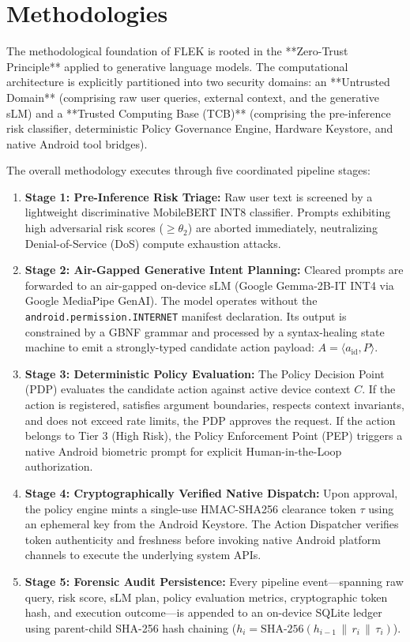 \section{Methodologies}

The methodological foundation of FLEK is rooted in the **Zero-Trust Principle** applied to generative language models. The computational architecture is explicitly partitioned into two security domains: an **Untrusted Domain** (comprising raw user queries, external context, and the generative sLM) and a **Trusted Computing Base (TCB)** (comprising the pre-inference risk classifier, deterministic Policy Governance Engine, Hardware Keystore, and native Android tool bridges).

The overall methodology executes through five coordinated pipeline stages:
\begin{enumerate}
    \item \textbf{Stage 1: Pre-Inference Risk Triage:} Raw user text is screened by a lightweight discriminative MobileBERT INT8 classifier. Prompts exhibiting high adversarial risk scores ($\ge \theta_2$) are aborted immediately, neutralizing Denial-of-Service (DoS) compute exhaustion attacks.
    \item \textbf{Stage 2: Air-Gapped Generative Intent Planning:} Cleared prompts are forwarded to an air-gapped on-device sLM (Google Gemma-2B-IT INT4 via Google MediaPipe GenAI). The model operates without the \texttt{android.permission.INTERNET} manifest declaration. Its output is constrained by a GBNF grammar and processed by a syntax-healing state machine to emit a strongly-typed candidate action payload: $A = \langle a_{\text{id}}, P \rangle$.
    \item \textbf{Stage 3: Deterministic Policy Evaluation:} The Policy Decision Point (PDP) evaluates the candidate action against active device context $C$. If the action is registered, satisfies argument boundaries, respects context invariants, and does not exceed rate limits, the PDP approves the request. If the action belongs to Tier 3 (High Risk), the Policy Enforcement Point (PEP) triggers a native Android biometric prompt for explicit Human-in-the-Loop authorization.
    \item \textbf{Stage 4: Cryptographically Verified Native Dispatch:} Upon approval, the policy engine mints a single-use HMAC-SHA256 clearance token $\tau$ using an ephemeral key from the Android Keystore. The Action Dispatcher verifies token authenticity and freshness before invoking native Android platform channels to execute the underlying system APIs.
    \item \textbf{Stage 5: Forensic Audit Persistence:} Every pipeline event—spanning raw query, risk score, sLM plan, policy evaluation metrics, cryptographic token hash, and execution outcome—is appended to an on-device SQLite ledger using parent-child SHA-256 hash chaining ($h_i = \text{SHA-256}(h_{i-1} \,\|\, r_i \,\|\, \tau_i)$).
\end{enumerate}

